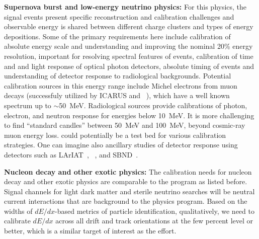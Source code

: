 \textbf{Supernova burst and low-energy neutrino physics:} For this physics, the signal events present specific reconstruction and calibration challenges and observable energy is shared between different charge clusters and types of energy depositions. Some of the primary requirements here include calibration of absolute energy scale and 
understanding and improving the nominal 20\% energy resolution, important for resolving spectral features of  events,
calibration of time and and light response of optical photon detectors, absolute timing of events and understanding of detector response to radiological backgrounds. Potential calibration sources in this energy range include Michel electrons from muon decays (successfuly utilized by ICARUS and ~\cite{Acciarri:2017sjy}), which have a well known spectrum up to $\sim$50~MeV. Radiological sources provide calibrations of photon, electron, and neutron response for energies below \SI{10}{\MeV}. It is more challenging to find ``standard candles'' between 50~MeV and \SI{100}{\MeV}, beyond cosmic-ray muon energy loss.  could potentially be a test bed for various calibration strategies. One can imagine also ancillary studies of detector response using detectors such as LArIAT~\cite{Cavanna:2014iqa}, ~\cite{Acciarri:2016smi}, and SBND~\cite{Antonello:2015lea}. %

\textbf{Nucleon decay and other exotic physics:} The calibration needs for nucleon decay and other exotic physics are comparable to the  program as listed before. Signal channels for light dark matter and sterile neutrino searches will be neutral current interactions that are background to the  physics program. %
Based on the widths of $dE/dx$-based metrics of particle identification, qualitatively, we need to calibrate $dE/dx$ across all drift and track orientations at the few percent level or better, which is a similar target of interest as the  effort.

